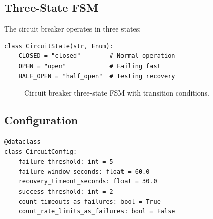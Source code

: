 \documentclass[11pt,a4paper]{article}
\theoremstyle{plain}
\theoremstyle{definition}
\begin{document}
\subsection{Three-State FSM}

The circuit breaker operates in three states:

\begin{lstlisting}[style=pythonstyle, caption={CircuitState FSM from \texttt{circuit\_breaker.py}}]
class CircuitState(str, Enum):
    CLOSED = "closed"        # Normal operation
    OPEN = "open"            # Failing fast
    HALF_OPEN = "half_open"  # Testing recovery
\end{lstlisting}

\begin{figure}[H]
\centering
{}
\caption{Circuit breaker three-state FSM with transition conditions.}
\label{fig:circuit}
\end{figure}

\subsection{Configuration}

\begin{lstlisting}[style=pythonstyle, caption={CircuitConfig from \texttt{circuit\_breaker.py}}]
@dataclass
class CircuitConfig:
    failure_threshold: int = 5
    failure_window_seconds: float = 60.0
    recovery_timeout_seconds: float = 30.0
    success_threshold: int = 2
    count_timeouts_as_failures: bool = True
    count_rate_limits_as_failures: bool = False
\end{lstlisting}
\end{document}
